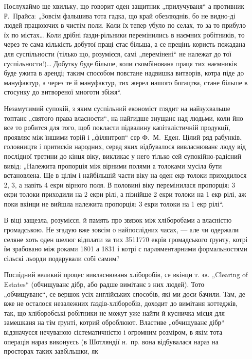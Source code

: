 
Послухаймо ще хвильку, що говорит оден защитник „прилучуваня“ а противник Р.~Прайса: „Зовсім
фальшива тота гадка, що край обезлюднів, бо не видно-ді людей працюючих в чистім поли. Коли їх
тепер убуло по селах, то за то прибуло їх по містах\dots{} Коли дрібні ґазди-рільники перемінились в
наємних робітників, то через те сама кількість добутої праці стає більша, а се прецінь користь
пожадана для суспільности (тілько що, розумієся, самі „перемінені“ не належат до тої
суспільности!)\dots{} Добутку буде більше, коли скомбінована праця тих наємників буде ужита в 
аренді; таким способом повстане надвишка витворів, котра піде до мануфактур, а через те й
мануфактур, тих жерел нашого богацтва, стане більше в стосунку до витвореної многоти збіжя“.

Незамутимий супокій, з яким суспільний економіст глядит на найзухвальше топтанє „святого права
власности“, на найгидше знущанє над людьми, коли йно все то робится для того, щоб покласти підвалину
капіталістичній продукції, проявляє між їншими торій і „філянтроп“ сер Ф.~М.~Еден. Цілий ряд
рабунків, головництв і притисків народних, серед яких відбувалося вивласнюванє люду від послідної
третини  до кінця  віку, викликає у него тілько сей супокійно-радісний вивід: „Належита
пропорція між вірними полями а толоками мусіла бути встановлена. Ще в цілім  і найбільшій части
 віку на оден екр толоки приходилося 2, 3, а навіть 4 екри вірного поля. В половині  віку
перемінилася пропорція: 3 екри толоки приходили на 2 екри рілі, а пізнійше 2 екри толоки на 1 екр
рілі, аж поки вкінци не вийшла належита пропорція: 3 екри толоки на 1 екр рілі“.

В  віці защезла, розумієся, й память про звязок між хліборобами а власністю громадською. Не
згадую вже зовсім о найпослідних часах, — але чи одержали селяне хоть оден шелюг відплати за тих
\num{3511770} екрів громадського ґрунту, котрі їм зрабовано між роками 1801 а 1831 і котрі с
парляментарними формальностями сільскі льорди подарували собі самим?

Послідний великий процес вивласнюваня хліборобів, се вкінци т. зв. „\textenglish{Clearing of Estates}“ (обчищуванє
дібр, або радше вимітанє з них людей). Тото „обчищуванє“, се вершок усіх англійських способів, які
ми доси бачили. Там, де вже не осталося незалежних ґаздів-хліборобів, доходит до вимітаня коттеджів,
так, що хліборобські робітники не можут уже найти й кусничка місця для замешканя на тім ґрунті,
котрий оброблюют. Властиве „обчищуванє дібр“ відзначуєся нечуваною сістематичністю і огромним
розміром, в якім тота операція нараз виконуєсь (в Шотляндії н.~пр.
вона відбувалася нараз на просторах таких завбільшки, як
\parbreak{}
